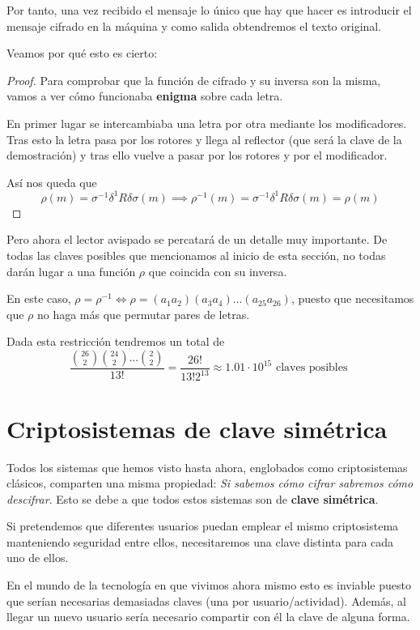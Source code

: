 Por tanto, una vez recibido el mensaje lo único que hay que hacer es introducir el mensaje cifrado en la máquina y como salida obtendremos el texto original.

Veamos por qué esto es cierto:
\begin{proof}
Para comprobar que la función de cifrado y su inversa son la misma, vamos a ver cómo funcionaba \textbf{enigma} sobre cada letra.

En primer lugar se intercambiaba una letra por otra mediante los modificadores. Tras esto la letra pasa por los rotores y llega al reflector (que será la clave de la demostración) y tras ello vuelve a pasar por los rotores y por el modificador.

Así nos queda que
\[\rho(m) = σ^{-1}δ^{1}Rδσ(m) \implies \rho^{-1}(m) = σ^{-1}δ^{1}Rδσ(m) = \rho(m)\]
\end{proof}

Pero ahora el lector avispado se percatará de un detalle muy importante. De todas las claves posibles que mencionamos al inicio de esta sección, no todas darán lugar a una función $\rho$ que coincida con su inversa.

En este caso, $\rho = \rho^{-1} \iff \rho = (a_1a_2)(a_3a_4)...(a_{25}a_{26})$, puesto que necesitamos que $\rho$ no haga más que permutar pares de letras.

Dada esta restricción tendremos un total de
\[\frac{{26 \choose 2} {24 \choose 2} ... {2 \choose 2}}{13!} =\frac{26!}{13!2^{13}} \approx 1.01 \cdot 10^{15} \text{ claves posibles }\]

\section{Criptosistemas de clave simétrica}
Todos los sistemas que hemos visto hasta ahora, englobados como criptosistemas clásicos, comparten una misma propiedad: \textit{Si sabemos cómo cifrar sabremos cómo descifrar}. Esto se debe a que todos estos sistemas son de \textbf{clave simétrica}.

Si pretendemos que diferentes usuarios puedan emplear el mismo criptosistema manteniendo seguridad entre ellos, necesitaremos una clave distinta para cada uno de ellos.

En el mundo de la tecnología en que vivimos ahora mismo esto es inviable puesto que serían necesarias demasiadas claves (una por usuario/actividad). Además, al llegar un nuevo usuario sería necesario compartir con él la clave de alguna forma.

